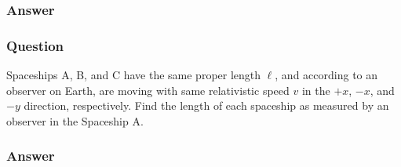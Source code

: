 \subsubsection{Answer}


\subsubsection{Question}
Spaceships A, B, and C have the same proper length $\ell$, and according to an observer on Earth, are moving with same relativistic speed $v$ in the $+x$, $-x$, and $-y$ direction, respectively. Find the length of each spaceship as measured by an observer in the Spaceship A.

\subsubsection{Answer}
